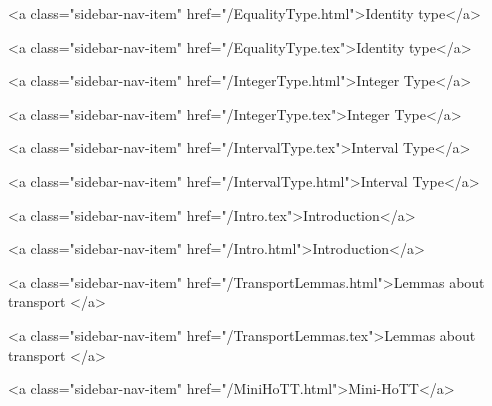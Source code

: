       
        
          <a class="sidebar-nav-item" href="/EqualityType.html">Identity type</a>
        
      
    
      
        
          <a class="sidebar-nav-item" href="/EqualityType.tex">Identity type</a>
        
      
    
      
        
          <a class="sidebar-nav-item" href="/IntegerType.html">Integer Type</a>
        
      
    
      
        
          <a class="sidebar-nav-item" href="/IntegerType.tex">Integer Type</a>
        
      
    
      
        
          <a class="sidebar-nav-item" href="/IntervalType.tex">Interval Type</a>
        
      
    
      
        
          <a class="sidebar-nav-item" href="/IntervalType.html">Interval Type</a>
        
      
    
      
        
          <a class="sidebar-nav-item" href="/Intro.tex">Introduction</a>
        
      
    
      
        
          <a class="sidebar-nav-item" href="/Intro.html">Introduction</a>
        
      
    
      
        
          <a class="sidebar-nav-item" href="/TransportLemmas.html">Lemmas about transport </a>
        
      
    
      
        
          <a class="sidebar-nav-item" href="/TransportLemmas.tex">Lemmas about transport </a>
        
      
    
      
        
          <a class="sidebar-nav-item" href="/MiniHoTT.html">Mini-HoTT</a>
        
      
    
